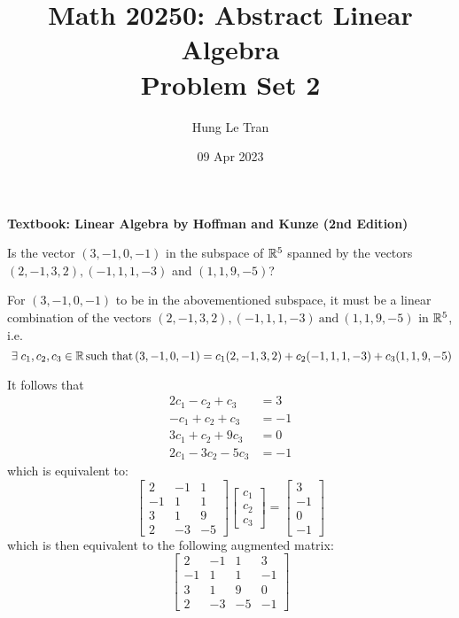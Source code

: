 \documentclass[a4paper, 11pt]{article}
\title{Math 20250: Abstract Linear Algebra \\ \large Problem Set 2}
\date{09 Apr 2023}
\author{Hung Le Tran}
\begin{document}
\maketitle
\newpage
\setcounter{section}{2}
\textbf{Textbook: Linear Algebra by Hoffman and Kunze (2nd Edition)}
\begin{problem} 
Is the vector \((3, -1, 0, -1)\) in the subspace of \(\mathbb{R}^5\) spanned by the vectors \((2, -1, 3, 2), (-1, 1, 1, -3)\) and \((1, 1, 9, -5)\)?
\end{problem}
\begin{solution}
    For \((3, -1, 0, -1)\) to be in the abovementioned subspace, it must be a linear combination of the vectors \((2, -1, 3, 2), (-1, 1, 1, -3) \:\text{and}\: (1, 1, 9, -5)\) in \(\mathbb{R}^5\), i.e. \[
        \exists c_1, c_2, c_3 \in \bbr \st (3, -1, 0, -1) = c_1(2, -1, 3, 2) + c_2(-1, 1, 1, -3) + c_3(1, 1, 9, -5)
    \]

    It follows that
    \begin{align*}
        2c_1 -c_2 + c_3   & =3   \\
        -c_1 + c_2 + c_3  & = -1 \\
        3c_1 + c_2 + 9c_3 & = 0  \\
        2c_1 -3c_2 -5c_3  & = -1
    \end{align*}
    which is equivalent to:
    \[
        \left[\begin{array}{ccc}
                2  & -1 & 1  \\
                -1 & 1  & 1  \\
                3  & 1  & 9  \\
                2  & -3 & -5
            \end{array}\right]\left[\begin{array}{c}
                c_1 \\
                c_2 \\
                c_3
            \end{array}\right] = \left[\begin{array}{c}
                3  \\
                -1 \\
                0  \\
                -1
            \end{array}\right]
    \]
    which is then equivalent to the following augmented matrix:
    \[
        \left[\begin{array}{cccc}
                2  & -1 & 1  & 3  \\
                -1 & 1  & 1  & -1 \\
                3  & 1  & 9  & 0  \\
                2  & -3 & -5 & -1
            \end{array}\right]
    \]


\end{solution}
\end{document}

